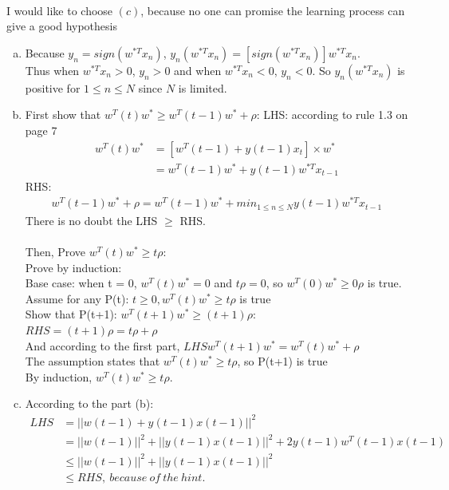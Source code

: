 \documentclass[11pt]{article}
\begin{document}
\\
I would like to choose $(c)$, because no one can promise the learning process can give a good hypothesis

\begin{enumerate} [(a)]
\item Because $y_n=sign(w^{*T}x_n)$, $y_n(w^{*T}x_n)=[sign(w^{*T}x_n)]w^{*T}x_n$.\\
Thus when $w^{*T}x_n > 0$, $y_n>0$ and when $w^{*T}x_n < 0$, $y_n<0$.
So $y_n(w^{*T}x_n)$ is positive for $1\leq n\leq N$ since $N$ is limited.

\item First show that $w^T(t)w^*\geq w^T(t-1)w^*+\rho$:
LHS: according to rule 1.3 on page 7\[
\begin{aligned}
w^T(t)w^* &= [w^T(t-1)+y(t-1)x_{t}] \times w^*\\
&=w^T(t-1)w^*+y(t-1)w^{*T}x_{t-1}
\end{aligned}
\]
RHS:
\[
\begin{aligned}
w^T(t-1)w^*+\rho = w^T(t-1)w^*+ min_{1\leq n \leq N}y(t-1)w^{*T}x_{t-1}
\end{aligned}
\]
There is no doubt the LHS $\geq$ RHS.
\\\\Then, Prove $w^T(t)w^*\geq t\rho$:\\
Prove by induction:\\
Base case: when t = 0, $w^T(t)w^* = 0$ and $t\rho=0$, so $w^T(0)w^*\geq 0\rho$ is true.\\
Assume for any P(t): $t\geq 0, w^T(t)w^*\geq t\rho$ is true\\
Show that P(t+1): $w^T(t+1)w^*\geq (t+1)\rho$:\\
$RHS=(t+1)\rho = t\rho +\rho$\\
And according to the first part, $LHSw^T(t+1)w^*=w^T(t)w^*+\rho$\\
The assumption states that $w^T(t)w^*\geq t\rho$, so P(t+1) is true\\
By induction, $w^T(t)w^*\geq t\rho$.

\newpage
\item According to the part (b):\[
\begin{aligned}
LHS &= ||w(t-1)+y(t-1)x(t-1)||^2\\
	&= ||w(t-1)||^2+||y(t-1)x(t-1)||^2+2y(t-1)w^T(t-1)x(t-1)\\
	&\leq ||w(t-1)||^2+||y(t-1)x(t-1)||^2\\
	&\leq RHS,\ because\ of\ the\ hint.
\end{aligned}
\]



\end{enumerate}
\end{document}
